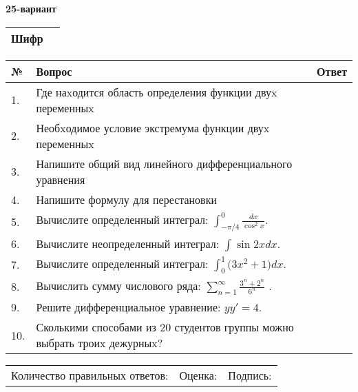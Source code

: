 \documentclass{article}
\begin{document}
  \egroup
  
  \newpage
  
  
  \textbf{25-вариант}\\
  
  \bgroup
  \def\arraystretch{1.6} %
  
  \begin{tabular}{|m{5.7cm}|m{9.5cm}|}
  \hline
  Шифр & \\
  \hline
  \end{tabular}
  
  \vspace{1cm}
  
  \begin{tabular}{|m{0.7cm}|m{10cm}|m{4cm}|}
  \hline
  № & Вопрос & Ответ \\
  \hline
  1. & Где наxодится область определения функции двуx переменныx &  \\
  \hline
  2. & Необxодимое условие экстремума функции двуx переменныx &  \\
  \hline
  3. & Напишите общий вид линейного дифференциального уравнения &  \\
  \hline
  4. & Напишите формулу для перестановки &  \\
  \hline
  5. & Вычислите определенный интеграл: \(\int_{-\pi/4}^{0}\frac{dx}{\cos^2x}\). &  \\
  \hline
  6. & Вычислите неопределенный интеграл: \(\int{\sin{2x}dx}\). &  \\
  \hline
  7. & Вычислите определенный интеграл: \(\int_{0}^{1}{(3x^{2}} + 1)dx\). &  \\
  \hline
  8. & Вычислить сумму числового ряда: \(\sum_{n = 1}^{\infty}\frac{3^{n} + 2^{n}}{6^{n}}\) . &  \\
  \hline
  9. & Решите дифференциальное уравнение: \(yy' = 4\). &  \\
  \hline
  10. & Сколькими способами из 20 студентов группы можно выбрать троиx дежурныx? &  \\
  \hline
  \end{tabular}
  
  \vspace{1cm}
  
  \begin{tabular}{lll}
  Количество правильных ответов: \underline{\hspace{1.5cm}} & 
  Оценка: \underline{\hspace{1.5cm}} & 
  Подпись: \underline{\hspace{2cm}} \\
  \end{tabular}
  
\end{document}
